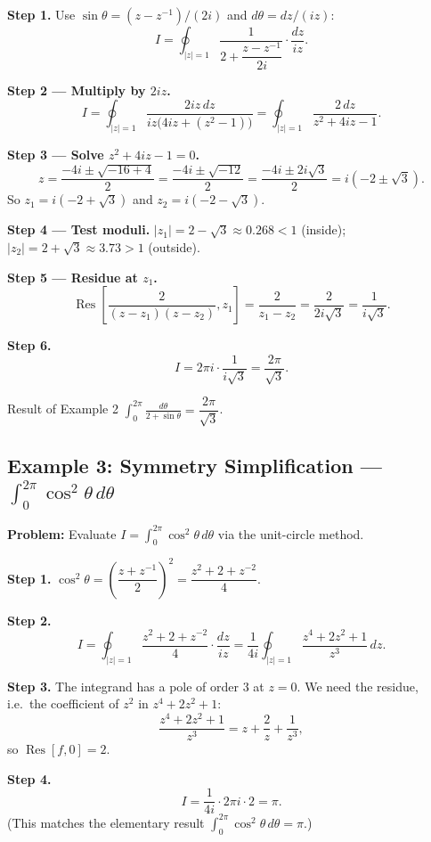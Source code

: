 \documentclass[12pt,a4paper]{article}
\begin{document}
\textbf{Step 1.} Use $\sin\theta = (z-z^{-1})/(2i)$ and $d\theta = dz/(iz)$:
\[
  I = \oint_{|z|=1} \frac{1}{2 + \dfrac{z-z^{-1}}{2i}} \cdot \frac{dz}{iz}.
\]

\textbf{Step 2 --- Multiply by $2iz$.}
\[
  I = \oint_{|z|=1} \frac{2iz\,dz}{iz\bigl(4iz + (z^2 - 1)\bigr)}
    = \oint_{|z|=1} \frac{2\,dz}{z^2 + 4iz - 1}.
\]

\textbf{Step 3 --- Solve $z^2 + 4iz - 1 = 0$.}
\[
  z = \frac{-4i \pm \sqrt{-16+4}}{2} = \frac{-4i \pm \sqrt{-12}}{2}
    = \frac{-4i \pm 2i\sqrt{3}}{2} = i(-2 \pm \sqrt{3}).
\]
So $z_1 = i(-2+\sqrt{3})$ and $z_2 = i(-2-\sqrt{3})$.

\textbf{Step 4 --- Test moduli.}
$|z_1| = 2 - \sqrt{3} \approx 0.268 < 1$ (inside);
$|z_2| = 2 + \sqrt{3} \approx 3.73 > 1$ (outside).

\textbf{Step 5 --- Residue at $z_1$.}
\[
  \operatorname{Res}\!\left[\frac{2}{(z-z_1)(z-z_2)},z_1\right]
  = \frac{2}{z_1 - z_2} = \frac{2}{2i\sqrt{3}} = \frac{1}{i\sqrt{3}}.
\]

\textbf{Step 6.}
\[
  I = 2\pi i \cdot \frac{1}{i\sqrt{3}} = \frac{2\pi}{\sqrt{3}}.
\]

\begin{learnbox}{Result of Example 2}
$\displaystyle\int_0^{2\pi}\frac{d\theta}{2+\sin\theta} = \dfrac{2\pi}{\sqrt{3}}$.
\end{learnbox}

\subsection*{Example 3: Symmetry Simplification --- $\displaystyle\int_0^{2\pi}\cos^2\theta\,d\theta$}

\textbf{Problem:} Evaluate $I = \int_0^{2\pi}\cos^2\theta\,d\theta$ via the unit-circle method.

\textbf{Step 1.} $\cos^2\theta = \left(\dfrac{z+z^{-1}}{2}\right)^2 = \dfrac{z^2 + 2 + z^{-2}}{4}$.

\textbf{Step 2.}
\[
  I = \oint_{|z|=1} \frac{z^2 + 2 + z^{-2}}{4} \cdot \frac{dz}{iz}
    = \frac{1}{4i}\oint_{|z|=1} \frac{z^4 + 2z^2 + 1}{z^3}\,dz.
\]

\textbf{Step 3.} The integrand has a pole of order 3 at $z = 0$. We need
the residue, i.e.\ the coefficient of $z^2$ in $z^4 + 2z^2 + 1$:
\[
  \frac{z^4 + 2z^2 + 1}{z^3} = z + \frac{2}{z} + \frac{1}{z^3},
\]
so $\operatorname{Res}[f,0] = 2$.

\textbf{Step 4.}
\[
  I = \frac{1}{4i} \cdot 2\pi i \cdot 2 = \pi.
\]
(This matches the elementary result $\int_0^{2\pi}\cos^2\theta\,d\theta = \pi$.)
\end{document}
